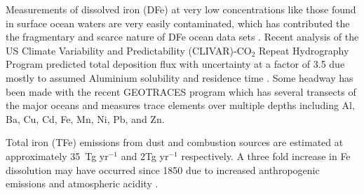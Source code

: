 Measurements of dissolved iron (DFe) at very low concentrations like those found in surface ocean waters are very easily contaminated, which has contributed the the fragmentary and scarce nature of DFe ocean data sets \cite{Rijkenberg_2014}.
Recent analysis of the US Climate Variability and Predictability (CLIVAR)-CO$_{2}$ Repeat Hydrography Program predicted total deposition flux with uncertainty at a factor of 3.5 due mostly to assumed Aluminium solubility and residence time \cite{Grand_2015}.
Some headway has been made with the recent GEOTRACES program which has several transects of the major oceans and measures trace elements over multiple depths including Al, Ba, Cu, Cd, Fe, Mn, Ni, Pb, and Zn.
  
Total iron (TFe) emissions from dust and combustion sources are estimated at approximately 35~Tg yr$^{-1}$ and 2Tg yr$^{-1}$ respectively. A three fold increase in Fe dissolution may have occurred since 1850 due to increased anthropogenic emissions and atmospheric acidity .
  
  
  
  